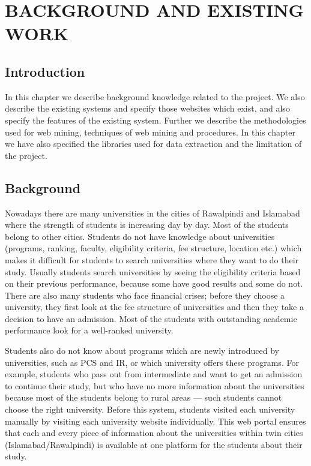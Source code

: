 \chapter{BACKGROUND AND EXISTING WORK}

\section{Introduction}

In this chapter we describe background knowledge related to the project. We also describe the existing systems and specify those websites which exist, and also specify the features of the existing system. Further we describe the methodologies used for web mining, techniques of web mining and procedures. In this chapter we have also specified the libraries used for data extraction and the limitation of the project.

\section{Background}

Nowadays there are many universities in the cities of Rawalpindi and Islamabad where the strength of students is increasing day by day. Most of the students belong to other cities. Students do not have knowledge about universities (programs, ranking, faculty, eligibility criteria, fee structure, location etc.) which makes it difficult for students to search universities where they want to do their study. Usually students search universities by seeing the eligibility criteria based on their previous performance, because some have good results and some do not. There are also many students who face financial crises; before they choose a university, they first look at the fee structure of universities and then they take a decision to have an admission. Most of the students with outstanding academic performance look for a well-ranked university.

Students also do not know about programs which are newly introduced by universities, such as PCS and IR, or which university offers these programs. For example, students who pass out from intermediate and want to get an admission to continue their study, but who have no more information about the universities because most of the students belong to rural areas --- such students cannot choose the right university. Before this system, students visited each university manually by visiting each university website individually. This web portal ensures that each and every piece of information about the universities within twin cities (Islamabad/Rawalpindi) is available at one platform for the students about their study.

